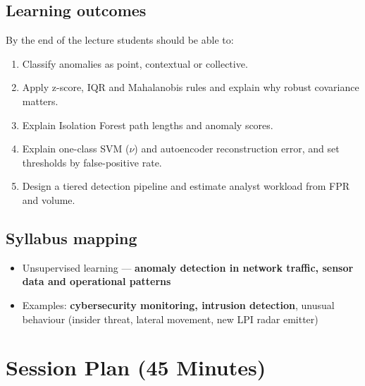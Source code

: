 \documentclass[11pt]{article}
\begin{document}
\subsection*{Learning outcomes}By the end of the lecture students should be able to:\begin{enumerate}\item Classify anomalies as point, contextual or collective.\item Apply z-score, IQR and Mahalanobis rules and explain why robust covariance matters.\item Explain Isolation Forest path lengths and anomaly scores.\item Explain one-class SVM ($\nu$) and autoencoder reconstruction error, and set thresholds by false-positive rate.\item Design a tiered detection pipeline and estimate analyst workload from FPR and volume.\end{enumerate}

\subsection*{Syllabus mapping}\begin{itemize}\item Unsupervised learning --- \textbf{anomaly detection in network traffic, sensor data and operational patterns}\item Examples: \textbf{cybersecurity monitoring, intrusion detection}, unusual behaviour (insider threat, lateral movement, new LPI radar emitter)\end{itemize}

\section{Session Plan (45 Minutes)}
\end{document}
